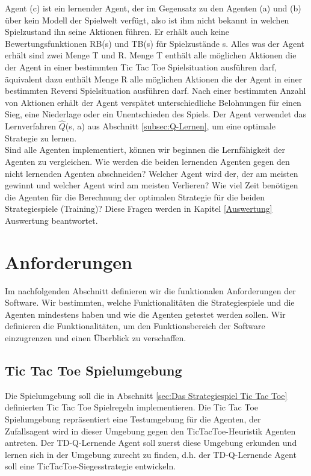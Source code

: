 Agent (c) ist ein lernender Agent, der im Gegensatz zu den Agenten (a) und (b) über kein Modell der Spielwelt verfügt, also ist ihm nicht bekannt in welchen Spielzustand ihn seine Aktionen führen. Er erhält auch keine Bewertungsfunktionen RB(s) und TB(s) für Spielzustände s. Alles was der Agent erhält sind zwei Menge T und R. Menge T enthält alle möglichen Aktionen die der Agent in einer bestimmten Tic Tac Toe Spielsituation ausführen darf, äquivalent dazu enthält Menge R alle möglichen Aktionen die der Agent in einer bestimmten Reversi Spielsituation ausführen darf. Nach einer bestimmten Anzahl von Aktionen erhält der Agent verspätet unterschiedliche Belohnungen für einen Sieg, eine Niederlage oder ein Unentschieden des Spiels. Der Agent verwendet das Lernverfahren $\hat{Q}$(s, a) aus Abschnitt  \ref{subsec:Q-Lernen}, um eine optimale Strategie zu lernen. \\

Sind alle Agenten implementiert, können wir beginnen die Lernfähigkeit der Agenten zu vergleichen. Wie werden die beiden lernenden Agenten gegen den nicht lernenden Agenten abschneiden? Welcher Agent wird der, der am meisten gewinnt und welcher Agent wird am meisten Verlieren? Wie viel Zeit benötigen die Agenten für die Berechnung der optimalen Strategie für die beiden Strategiespiele (Training)? Diese Fragen werden in Kapitel \ref{Auswertung} Auswertung beantwortet.

\section{Anforderungen}
\label{sec:Anforderungen}
Im nachfolgenden Abschnitt definieren wir die funktionalen Anforderungen der Software. Wir bestimmten, welche Funktionalitäten die Strategiespiele und die Agenten mindestens haben und wie die Agenten getestet werden sollen. Wir definieren die Funktionalitäten, um den Funktionsbereich der Software einzugrenzen und einen Überblick zu verschaffen.

\subsection{Tic Tac Toe Spielumgebung}
Die Spielumgebung soll die in Abschnitt \ref{sec:Das Strategiespiel Tic Tac Toe} definierten Tic Tac Toe Spielregeln implementieren. Die Tic Tac Toe Spielumgebung repräsentiert eine Testumgebung für die Agenten, der Zufallsagent wird in dieser Umgebung gegen den TicTacToe-Heuristik Agenten antreten. Der TD-Q-Lernende Agent soll zuerst diese Umgebung erkunden und lernen sich in der Umgebung zurecht zu finden, d.h. der TD-Q-Lernende Agent soll eine TicTacToe-Siegesstrategie entwickeln. 

